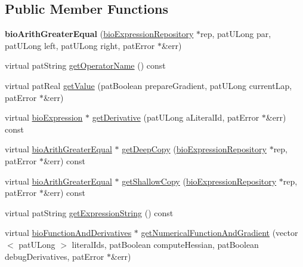 \subsection*{Public Member Functions}
\begin{DoxyCompactItemize}
\item 
\mbox{\label{classbio_arith_greater_equal_a78e8faa5e1e56babf358b1d795743d01}} 
{\bfseries bio\+Arith\+Greater\+Equal} (\hyperlink{classbio_expression_repository}{bio\+Expression\+Repository} $\ast$rep, pat\+U\+Long par, pat\+U\+Long left, pat\+U\+Long right, pat\+Error $\ast$\&err)
\item 
virtual pat\+String \hyperlink{classbio_arith_greater_equal_ab98914bebec6a6dfc6abb9c114a4c7ed}{get\+Operator\+Name} () const
\item 
virtual pat\+Real \hyperlink{classbio_arith_greater_equal_ad9948d07e8c792d998fa6b6099b17633}{get\+Value} (pat\+Boolean prepare\+Gradient, pat\+U\+Long current\+Lap, pat\+Error $\ast$\&err)
\item 
virtual \hyperlink{classbio_expression}{bio\+Expression} $\ast$ \hyperlink{classbio_arith_greater_equal_a6964afaf174b6e1de101f2439e266477}{get\+Derivative} (pat\+U\+Long a\+Literal\+Id, pat\+Error $\ast$\&err) const
\item 
virtual \hyperlink{classbio_arith_greater_equal}{bio\+Arith\+Greater\+Equal} $\ast$ \hyperlink{classbio_arith_greater_equal_aa5ff24eef069374f9c8778ab8569ff7d}{get\+Deep\+Copy} (\hyperlink{classbio_expression_repository}{bio\+Expression\+Repository} $\ast$rep, pat\+Error $\ast$\&err) const
\item 
virtual \hyperlink{classbio_arith_greater_equal}{bio\+Arith\+Greater\+Equal} $\ast$ \hyperlink{classbio_arith_greater_equal_a00fdd329a5be536817f97e532ad29fc5}{get\+Shallow\+Copy} (\hyperlink{classbio_expression_repository}{bio\+Expression\+Repository} $\ast$rep, pat\+Error $\ast$\&err) const
\item 
virtual pat\+String \hyperlink{classbio_arith_greater_equal_a6585da182f8a3cf7063f55be1b68af6c}{get\+Expression\+String} () const
\item 
virtual \hyperlink{classbio_function_and_derivatives}{bio\+Function\+And\+Derivatives} $\ast$ \hyperlink{classbio_arith_greater_equal_aa5ee24b87d59239ca9a0549f72ef8c09}{get\+Numerical\+Function\+And\+Gradient} (vector$<$ pat\+U\+Long $>$ literal\+Ids, pat\+Boolean compute\+Hessian, pat\+Boolean debug\+Derivatives, pat\+Error $\ast$\&err)
\end{DoxyCompactItemize}
